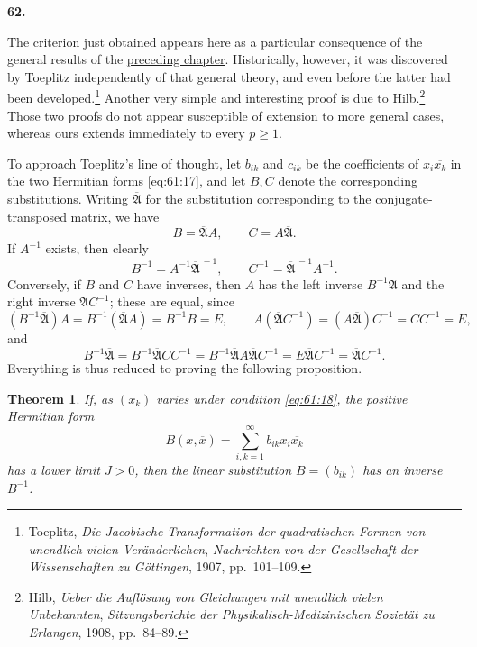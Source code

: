 \documentclass[
  paper=b5,
  fontsize=13pt,
  twoside=true,
  open=any,
  bookmarkpackage=false,
  chapterprefix=true,
  headings=normal
]{scrbook}
\newtheorem*{theorem}{Theorem}
\theoremstyle{definition}
\newcommand{\numberedparagraph}[1]{%
  \par\medskip\phantomsection\label{sec:#1}%
  \noindent\textbf{#1.}\enspace
}
\begin{document}
\numberedparagraph{62}
The criterion just obtained appears here as a particular consequence of
the general results of the \hyperref[chap:3]{preceding chapter}. Historically, however, it
was discovered by Toeplitz independently of that general theory, and even
before the latter had been developed.\footnote{Toeplitz,
\emph{Die Jacobische Transformation der quadratischen Formen von unendlich
vielen Ver\"anderlichen}, \emph{Nachrichten von der Gesellschaft der
Wissenschaften zu G\"ottingen}, 1907, pp.~101--109.} Another very simple and
interesting proof is due to Hilb.\footnote{Hilb, \emph{Ueber die Aufl\"osung
von Gleichungen mit unendlich vielen Unbekannten}, \emph{Sitzungsberichte
der Physikalisch-Medizinischen Soziet\"at zu Erlangen}, 1908, pp.~84--89.}
Those two proofs do not appear susceptible of extension to more general
cases, whereas ours extends immediately to every $p\geq1$.

To approach Toeplitz's line of thought, let $b_{ik}$ and $c_{ik}$ be the
coefficients of $x_i\overline{x_k}$ in the two Hermitian forms
\eqref{eq:61:17}, and let $B,C$ denote the corresponding substitutions.
Writing $\overline{\mathfrak A}$ for the substitution corresponding to the
conjugate-transposed matrix, we have
\[
  B=\overline{\mathfrak A}A,
  \qquad
  C=A\overline{\mathfrak A}.
\]
If $A^{-1}$ exists, then clearly
\[
  B^{-1}=A^{-1}\overline{\mathfrak A}^{\,-1},
  \qquad
  C^{-1}=\overline{\mathfrak A}^{\,-1}A^{-1}.
\]
Conversely, if $B$ and $C$ have inverses, then $A$ has the left inverse
$B^{-1}\overline{\mathfrak A}$ and the right inverse
$\overline{\mathfrak A}C^{-1}$; these are equal, since
\[
 (B^{-1}\overline{\mathfrak A})A
 =B^{-1}(\overline{\mathfrak A}A)=B^{-1}B=E,
  \qquad
 A(\overline{\mathfrak A}C^{-1})
 =(A\overline{\mathfrak A})C^{-1}=CC^{-1}=E,
\]
and
\[
 B^{-1}\overline{\mathfrak A}
 =B^{-1}\overline{\mathfrak A}CC^{-1}
 =B^{-1}\overline{\mathfrak A}A\overline{\mathfrak A}C^{-1}
 =E\overline{\mathfrak A}C^{-1}
 =\overline{\mathfrak A}C^{-1}.
\]
Everything is thus reduced to proving the following proposition.

\begin{theorem}
If, as $(x_k)$ varies under condition \eqref{eq:61:18}, the positive
Hermitian form
\begin{equation}
  B(x,\overline{x})=
  \sum_{i,k=1}^{\infty}b_{ik}x_i\overline{x_k}
  \tag{19}\label{eq:62:19}
\end{equation}
has a lower limit $J>0$, then the linear substitution $B=(b_{ik})$ has an
inverse $B^{-1}$.
\end{theorem}
\end{document}

